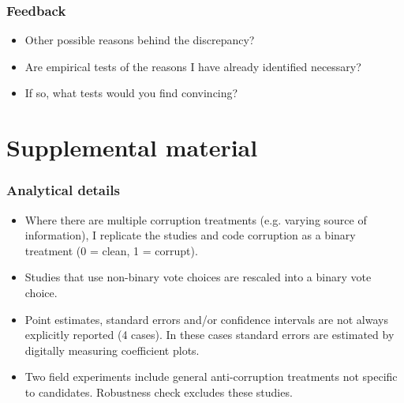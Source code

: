 \documentclass[usenames,dvipsnames]{beamer}
\begin{document}

\begin{frame}
\frametitle{Feedback}
\begin{itemize}
\item Other possible reasons behind the discrepancy?
\pause
\vspace{0.25cm}
\item Are empirical tests of the reasons I have already identified necessary?
\pause
\vspace{0.25cm}
\item If so, what tests would you find convincing? 
\end{itemize}

\end{frame}

\appendix

\section{Supplemental material}

\begin{frame}[label=details, noframenumbering]
\frametitle{Analytical details \hyperlink{methods}{}}
\begin{itemize}
\item Where there are multiple corruption treatments (e.g. varying source of information), I replicate the studies and code corruption as a binary treatment (0 = clean, 1 = corrupt).
\pause
\item Studies that use non-binary vote choices are rescaled into a binary vote choice.
\pause
\item Point estimates, standard errors and/or confidence intervals are not always explicitly reported (4 cases). In these cases standard errors are estimated by digitally measuring coefficient plots.
\pause
\item Two field experiments include general anti-corruption treatments not specific to candidates. Robustness check excludes these studies. 
\end{itemize}
\end{frame}

\end{document}
